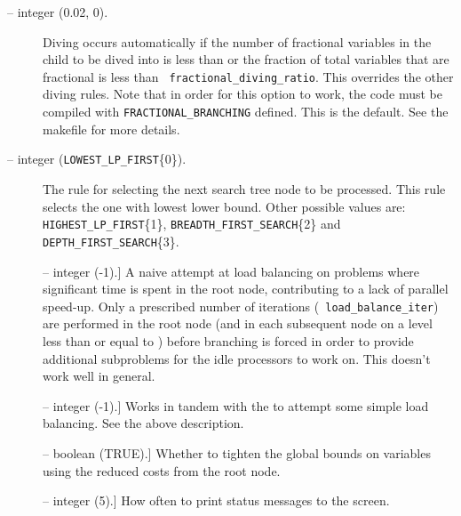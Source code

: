 \begin{description}
\label{fractional_diving}
\item[\ptt{fractional\_diving\_ratio, fractional\_diving\_num} --
integer (0.02, 0).]

Diving occurs automatically if the number of fractional variables in
the child to be dived into is less than 
or the fraction of total variables that are fractional is less than {\tt
fractional\_diving\_ratio}. This overrides the other diving rules.
Note that in order for this option to work, the code must be compiled
with {\tt FRACTIONAL\_BRANCHING} defined. This is the default. See the
makefile for more details.

\item[\ptt{node\_selection\_rule} -- integer ({\tt LOWEST\_LP\_FIRST}\{0\}).] 
The rule for selecting the next search tree node to be processed. This rule
selects the one with lowest lower bound. Other possible values are: {\tt
HIGHEST\_LP\_FIRST}\{1\}, {\tt BREADTH\_FIRST\_SEARCH}\{2\} and {\tt
DEPTH\_FIRST\_SEARCH}\{3\}.

\item[\ptt{load\_balance\_level}] -- integer (-1).] 
A naive attempt at load balancing on problems where significant time
is spent in the root node, contributing to a lack of parallel
speed-up. Only a prescribed number of iterations ({\tt
load\_balance\_iter}) are performed in the root node (and in each
subsequent node on
a level less than or equal to ) before
branching is forced in order to provide additional subproblems for the
idle processors to work on. This doesn't work well in general.

\item[\ptt{load\_balance\_iter}] -- integer (-1).] 
Works in tandem with the  to attempt some
simple load balancing. See the above description.

\item[\ptt{tighten\_root\_bounds}] -- boolean (TRUE).]
Whether to tighten the global bounds on variables using the reduced costs
from the root node.

\item[\ptt{status\_interval}] -- integer (5).]
How often to print status messages to the screen. 


\end{description}
